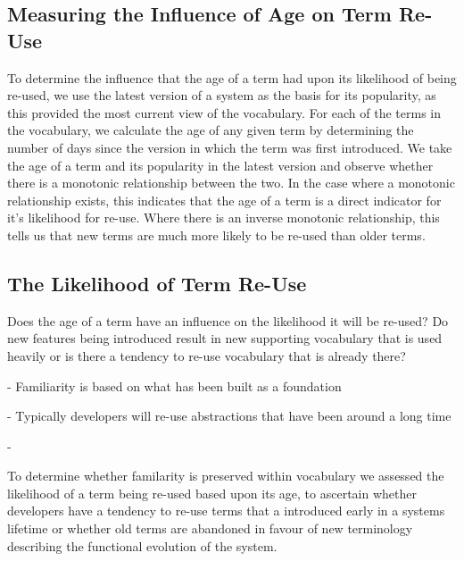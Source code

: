 \subsection{Measuring the Influence of Age on Term Re-Use} %
\label{sub:measuring_the_influence_of_age_on_term_re_use}

To determine the influence that the age of a term had upon its likelihood of being re-used, we use the latest version of a system as the basis for its popularity, as this provided the most current view of the vocabulary. For each of the terms in the vocabulary, we calculate the age of any given term by determining the number of days since the version in which the term was first introduced. We take the age of a term and its popularity in the latest version and observe whether there is a monotonic relationship between the two. In the case where a monotonic relationship exists, this indicates that the age of a term is a direct indicator for it's likelihood for re-use. Where there is an inverse monotonic relationship, this tells us that new terms are much more likely to be re-used than older terms.


\subsection{The Likelihood of Term Re-Use} %
\label{sub:the_likelihood_of_term_re_use}

Does the age of a term have an influence on the likelihood it will be re-used? Do new features being introduced result in new supporting vocabulary that is used heavily or is there a tendency to re-use vocabulary that is already there?


\crumbs
{
- Familiarity is based on what has been built as a foundation

- Typically developers will re-use abstractions that have been around a long time

- 
}

To determine whether familarity is preserved within vocabulary we assessed the likelihood of a term being re-used based upon its age, to ascertain whether developers have a tendency to re-use terms that a introduced early in a systems lifetime or whether old terms are abandoned in favour of new terminology describing the functional evolution of the system.


